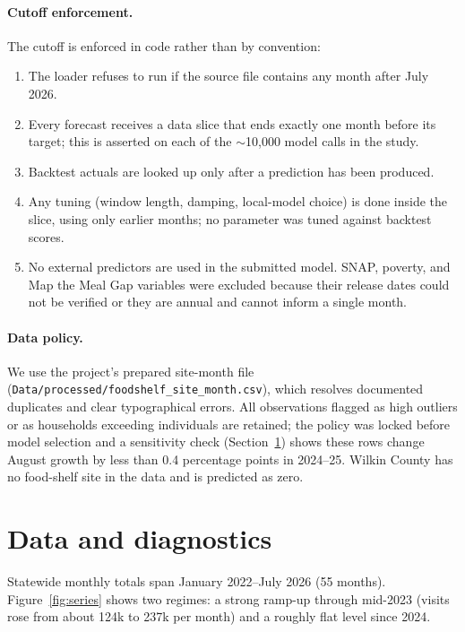 \documentclass[11pt,letterpaper]{article}
\begin{document}
\paragraph{Cutoff enforcement.} The cutoff is enforced in code rather than by convention:
\begin{enumerate}
  \item The loader refuses to run if the source file contains any month after July 2026.
  \item Every forecast receives a data slice that ends exactly one month before its target; this is
        asserted on each of the $\sim$10{,}000 model calls in the study.
  \item Backtest actuals are looked up only after a prediction has been produced.
  \item Any tuning (window length, damping, local-model choice) is done inside the slice, using only
        earlier months; no parameter was tuned against backtest scores.
  \item No external predictors are used in the submitted model. SNAP, poverty, and Map the Meal Gap
        variables were excluded because their release dates could not be verified or they are
        annual and cannot inform a single month.
\end{enumerate}

\paragraph{Data policy.} We use the project's prepared site-month file
(\texttt{Data/processed/}\allowbreak\texttt{foodshelf\_site\_month.csv}), which resolves documented duplicates and
clear typographical errors. All observations flagged as high outliers or as households exceeding
individuals are retained; the policy was locked before model selection and a sensitivity check
(Section~\ref{sec:diag}) shows these rows change August growth by less than 0.4 percentage points
in 2024--25. Wilkin County has no food-shelf site in the data and is predicted as zero.

\section{Data and diagnostics}\label{sec:diag}
Statewide monthly totals span January 2022--July 2026 (55 months). Figure~\ref{fig:series} shows two
regimes: a strong ramp-up through mid-2023 (visits rose from about 124k to 237k per month) and a
roughly flat level since 2024.
\end{document}
